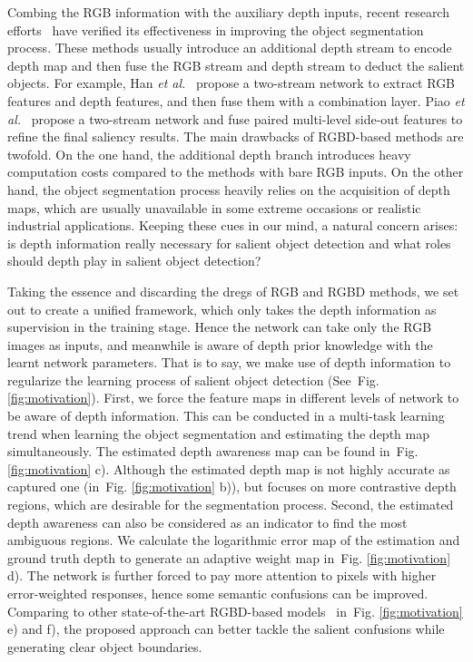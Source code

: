 \documentclass[sigconf]{acmart}
\def\etal{{\em et al.}}
\newcommand{\figref}[1]{Fig. \ref{#1}}
\begin{document}
Combing the RGB information with the auxiliary depth inputs, recent research efforts~\cite{han2017cnns,piao2019depth,zhao2019contrast} have verified its effectiveness in improving the object segmentation process. 
These methods usually introduce an additional depth stream to encode depth map and then fuse the RGB stream and depth stream to deduct the salient objects. For example, Han \etal ~\cite{han2017cnns} propose a two-stream network to extract RGB features and depth features, and then fuse them with a combination layer. Piao \etal~\cite{piao2019depth} propose a two-stream network and fuse paired multi-level side-out features to refine the final saliency results.
The main drawbacks of RGBD-based methods are twofold. On the one hand, the additional depth branch introduces heavy computation costs compared to the methods with bare RGB inputs. On the other hand, the object segmentation process heavily relies on the acquisition of depth maps, which are usually unavailable in some extreme occasions or realistic industrial applications.
Keeping these cues in our mind, a natural concern arises: is depth information really necessary for salient object detection and what roles should depth play in salient object detection? 

Taking the essence and discarding the dregs of RGB and RGBD methods, we set out to create a unified framework, which only takes the depth information as supervision in the training stage. Hence the network can take only the RGB images as inputs, and meanwhile is aware of depth prior knowledge with the learnt network parameters. That is to say, we make use of depth information to regularize the learning process of salient object detection (See~\figref{fig:motivation}). First, we force the feature maps in different levels of network to be aware of depth information. This can be conducted in a multi-task learning trend when learning the object segmentation and estimating the depth map simultaneously. The estimated depth awareness map can be found in~\figref{fig:motivation} c). Although the estimated depth map is not highly accurate as captured one (in~\figref{fig:motivation} b)), but focuses on more contrastive depth regions, which are desirable for the segmentation process.
Second, the estimated depth awareness can also be considered as an indicator to find the most ambiguous regions. We calculate the logarithmic error map of the estimation and ground truth depth to generate an adaptive weight map in~\figref{fig:motivation} d). The network is further forced to pay more attention to pixels with higher error-weighted responses, hence some semantic confusions can be improved. Comparing to other state-of-the-art RGBD-based models~\cite{zhao2019contrast,fan2019D3Net} in~\figref{fig:motivation} e) and f), the proposed approach can better tackle the salient confusions while generating clear object boundaries. 
\end{document}
